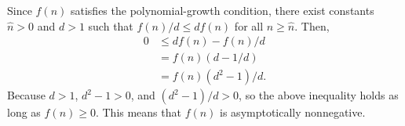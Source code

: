 Since $f(n)$ satisfies the polynomial-growth condition, there exist constants $\widehat{n}>0$ and $d>1$ such that $f(n)/d\le df(n)$ for all $n\ge\widehat{n}$.
Then,
\begin{align*}
    0 &\le df(n)-f(n)/d \\
    &= f(n)(d-1/d) \\
    &= f(n)(d^2-1)/d.
\end{align*}
Because $d>1$, $d^2-1>0$, and $(d^2-1)/d>0$, so the above inequality holds as long as $f(n)\ge0$.
This means that $f(n)$ is asymptotically nonnegative.
